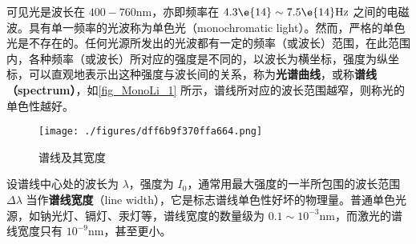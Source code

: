 

可见光是波长在 $400-760\mathrm{nm}$，亦即频率在 $4.3\e{14} \sim 7.5\e{14} \mathrm{Hz}$ 之间的电磁波。具有单一频率的光波称为单色光（monochromatic light）。然而，严格的单色光是不存在的。任何光源所发出的光波都有一定的频率（或波长）范围，在此范围内，各种频率（或波长）所对应的强度是不同的，以波长为横坐标，强度为纵坐标，可以直观地表示出这种强度与波长间的关系，称为\textbf{光谱曲线}，或称\textbf{谱线（spectrum）}，如\autoref{fig_MonoLi_1} 所示，谱线所对应的波长范围越窄，则称光的单色性越好。
\begin{figure}[ht]
\centering
\texttt{[image: ./figures/dff6b9f370ffa664.png]}
\caption{谱线及其宽度} \label{fig_MonoLi_1}
\end{figure}

设谱线中心处的波长为 $\lambda$，强度为 $I_0$，通常用最大强度的一半所包围的波长范围 $\Delta\lambda$ 当作\textbf{谱线宽度}（line width），它是标志谱线单色性好坏的物理量。普通单色光源，如钠光灯、镉灯、汞灯等，谱线宽度的数量级为 $0.1 \sim 10^{-3} \mathrm{nm}$，而激光的谱线宽度只有 $10^{-9}\mathrm{nm}$，甚至更小。
